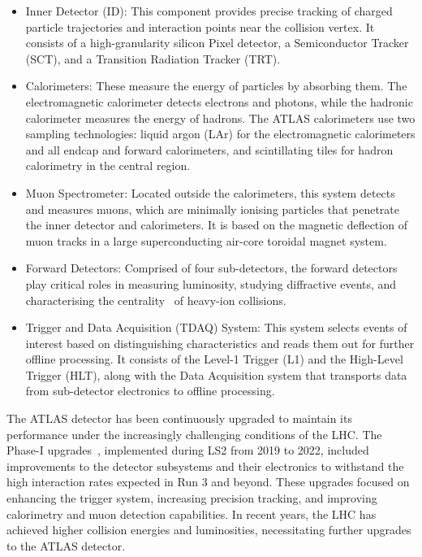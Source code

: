     \begin{itemize}
        \item Inner Detector (ID): This component provides precise tracking of charged particle trajectories and interaction points near the collision vertex. It consists of a high-granularity silicon Pixel detector, a Semiconductor Tracker (SCT), and a Transition Radiation Tracker (TRT).
        \item Calorimeters: These measure the energy of particles by absorbing them. The electromagnetic calorimeter detects electrons and photons, while the hadronic calorimeter measures the energy of hadrons. The ATLAS calorimeters use two sampling technologies: liquid argon (LAr) for the electromagnetic calorimeters and all endcap and forward calorimeters, and scintillating tiles for hadron calorimetry in the central region.
        \item Muon Spectrometer: Located outside the calorimeters, this system detects and measures muons, which are minimally ionising particles that penetrate the inner detector and calorimeters. It is based on the magnetic deflection of muon tracks in a large superconducting air-core toroidal magnet system.
        \item Forward Detectors: Comprised of four sub-detectors, the forward detectors play critical roles in measuring luminosity, studying diffractive events, and characterising the centrality~\cite{HION-2010-01} of heavy-ion collisions.
        \item Trigger and Data Acquisition (TDAQ) System: This system selects events of interest based on distinguishing characteristics and reads them out for further offline processing. It consists of the Level-1 Trigger (L1) and the High-Level Trigger (HLT), along with the Data Acquisition system that transports data from sub-detector electronics to offline processing.
    \end{itemize}
    The ATLAS detector has been continuously upgraded to maintain its performance under the increasingly challenging 
    conditions of the LHC. The Phase-I upgrades~\cite{ATLAS-TDR-20,ATLAS-TDR-22,ATLAS-TDR-23,ATLAS-TDR-24}, 
    implemented during LS2 from 2019 to 2022, included improvements to the detector subsystems and their electronics to withstand the high interaction rates expected 
    in Run 3 and beyond. These upgrades focused on enhancing the trigger system, increasing precision tracking, 
    and improving calorimetry and muon detection capabilities. In recent years, the LHC has achieved higher collision 
    energies and luminosities, necessitating further upgrades to the ATLAS detector. 
